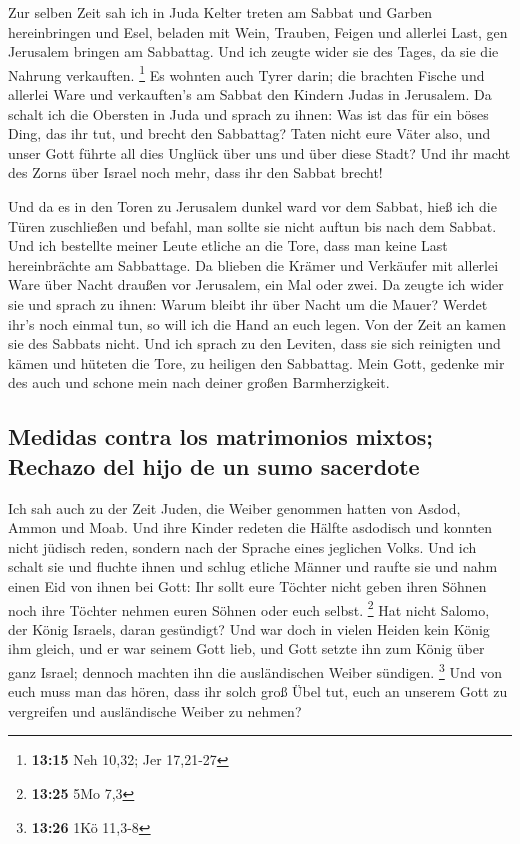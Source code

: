  Zur selben Zeit sah ich in Juda Kelter treten am Sabbat
und Garben hereinbringen und Esel, beladen mit Wein, Trauben, Feigen und
allerlei Last, gen Jerusalem bringen am Sabbattag. Und ich zeugte wider
sie des Tages, da sie die Nahrung verkauften. \footnote{\textbf{13:15}
  Neh 10,32; Jer 17,21-27}  Es wohnten auch Tyrer darin;
die brachten Fische und allerlei Ware und verkauften's am Sabbat den
Kindern Judas in Jerusalem.  Da schalt ich die Obersten
in Juda und sprach zu ihnen: Was ist das für ein böses Ding, das ihr
tut, und brecht den Sabbattag?  Taten nicht eure Väter
also, und unser Gott führte all dies Unglück über uns und über diese
Stadt? Und ihr macht des Zorns über Israel noch mehr, dass ihr den
Sabbat brecht!

 Und da es in den Toren zu Jerusalem dunkel ward vor dem
Sabbat, hieß ich die Türen zuschließen und befahl, man sollte sie nicht
auftun bis nach dem Sabbat. Und ich bestellte meiner Leute etliche an
die Tore, dass man keine Last hereinbrächte am Sabbattage.
 Da blieben die Krämer und Verkäufer mit allerlei Ware
über Nacht draußen vor Jerusalem, ein Mal oder zwei.  Da
zeugte ich wider sie und sprach zu ihnen: Warum bleibt ihr über Nacht um
die Mauer? Werdet ihr's noch einmal tun, so will ich die Hand an euch
legen. Von der Zeit an kamen sie des Sabbats nicht.  Und
ich sprach zu den Leviten, dass sie sich reinigten und kämen und hüteten
die Tore, zu heiligen den Sabbattag. Mein Gott, gedenke mir des auch und
schone mein nach deiner großen Barmherzigkeit.

\hypertarget{medidas-contra-los-matrimonios-mixtos-rechazo-del-hijo-de-un-sumo-sacerdote}{%
\subsection{Medidas contra los matrimonios mixtos; Rechazo del hijo de
un sumo
sacerdote}\label{medidas-contra-los-matrimonios-mixtos-rechazo-del-hijo-de-un-sumo-sacerdote}}

 Ich sah auch zu der Zeit Juden, die Weiber genommen
hatten von Asdod, Ammon und Moab.  Und ihre Kinder
redeten die Hälfte asdodisch und konnten nicht jüdisch reden, sondern
nach der Sprache eines jeglichen Volks.  Und ich schalt
sie und fluchte ihnen und schlug etliche Männer und raufte sie und nahm
einen Eid von ihnen bei Gott: Ihr sollt eure Töchter nicht geben ihren
Söhnen noch ihre Töchter nehmen euren Söhnen oder euch selbst.
\footnote{\textbf{13:25} 5Mo 7,3}  Hat nicht Salomo, der
König Israels, daran gesündigt? Und war doch in vielen Heiden kein König
ihm gleich, und er war seinem Gott lieb, und Gott setzte ihn zum König
über ganz Israel; dennoch machten ihn die ausländischen Weiber sündigen.
\footnote{\textbf{13:26} 1Kö 11,3-8}  Und von euch muss
man das hören, dass ihr solch groß Übel tut, euch an unserem Gott zu
vergreifen und ausländische Weiber zu nehmen?

